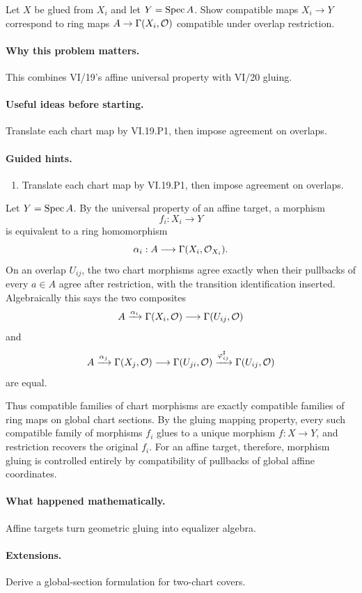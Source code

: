 \begin{problem}\label{prob:vi20-p14}
Let $X$ be glued from $X_i$ and let $Y=\operatorname{Spec} A$. Show compatible maps $X_i\to Y$ correspond to ring maps $A\to\Gamma(X_i,\mathcal O)$ compatible under overlap restriction.
\end{problem}

\ifdefined\FullProblemDossiers
\paragraph{Why this problem matters.}
This combines VI/19's affine universal property with VI/20 gluing.

\paragraph{Useful ideas before starting.}
Translate each chart map by VI.19.P1, then impose agreement on overlaps.

\paragraph{Guided hints.}
\begin{enumerate}
\item Translate each chart map by VI.19.P1, then impose agreement on overlaps.
\end{enumerate}

\begin{solution}
Let $Y=\operatorname{Spec} A$.  By the universal property of an affine target, a morphism
\[
f_i:X_i\longrightarrow Y
\]
is equivalent to a ring homomorphism
\[
\alpha_i:A\longrightarrow\Gamma(X_i,\mathcal O_{X_i}).
\]
On an overlap $U_{ij}$, the two chart morphisms agree exactly when their pullbacks of every $a\in A$ agree after restriction, with the transition identification inserted.  Algebraically this says the two composites
\[
A\xrightarrow{\alpha_i}\Gamma(X_i,\mathcal O)\longrightarrow\Gamma(U_{ij},\mathcal O)
\]
and
\[
A\xrightarrow{\alpha_j}\Gamma(X_j,\mathcal O)\longrightarrow\Gamma(U_{ji},\mathcal O)
\xrightarrow{\varphi_{ij}^{\sharp}}\Gamma(U_{ij},\mathcal O)
\]
are equal.

Thus compatible families of chart morphisms are exactly compatible families of ring maps on global chart sections.  By the gluing mapping property, every such compatible family of morphisms $f_i$ glues to a unique morphism $f:X\to Y$, and restriction recovers the original $f_i$.  For an affine target, therefore, morphism gluing is controlled entirely by compatibility of pullbacks of global affine coordinates.
\end{solution}


\paragraph{What happened mathematically.}
Affine targets turn geometric gluing into equalizer algebra.

\paragraph{Extensions.}
Derive a global-section formulation for two-chart covers.
\fi
